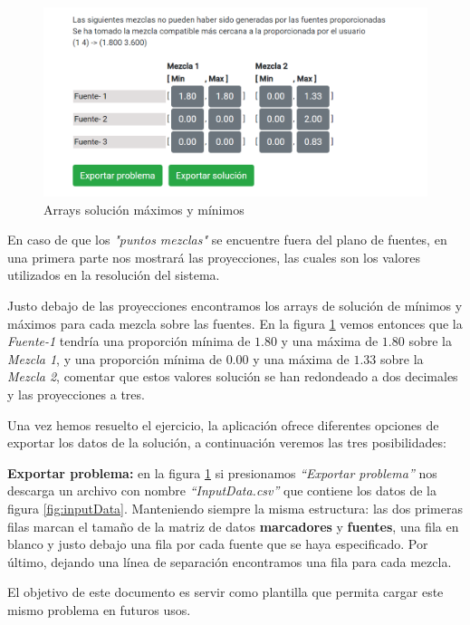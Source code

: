 \begin{figure}[h!] 
\centering
    \includegraphics[width=1\textwidth]{img/solution_visual.PNG}
\caption{Arrays solución máximos y mínimos}
\label{fig:sols_arrays}
\end{figure}

En caso de que los \textit{"puntos mezclas"} se encuentre fuera del plano de fuentes, en una primera parte nos mostrará las proyecciones, las cuales son los valores utilizados en la resolución del sistema. 

Justo debajo de las proyecciones encontramos los arrays de solución de mínimos y máximos para cada mezcla sobre las fuentes. En la figura \ref{fig:sols_arrays} vemos entonces que la \textit{Fuente-1} tendría una proporción mínima de $1.80$ y una máxima de $1.80$ sobre la \textit{Mezcla 1}, y una proporción mínima de $0.00$ y una máxima de $1.33$ sobre la \textit{Mezcla 2}, comentar que estos valores solución se han redondeado a dos decimales y las proyecciones a tres.

Una vez hemos resuelto el ejercicio, la aplicación ofrece diferentes opciones de exportar los datos de la solución, a continuación veremos las tres posibilidades:

\textbf{Exportar problema: } en la figura \ref{fig:sols_arrays} si presionamos \textit{``Exportar problema''} nos descarga un archivo con nombre \textit{``InputData.csv''} que contiene los datos de la figura \ref{fig:inputData}. Manteniendo siempre la misma estructura: las dos primeras filas marcan el tamaño de la matriz de datos \textbf{marcadores} y \textbf{fuentes}, una fila en blanco y justo debajo una fila por cada fuente que se haya especificado. Por último, dejando una línea de separación encontramos una fila para cada mezcla. 

El objetivo de este documento es servir como plantilla que permita cargar este mismo problema en futuros usos.

